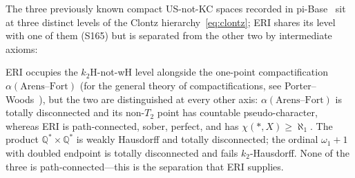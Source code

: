 \documentclass[11pt]{article}
\theoremstyle{definition}
\theoremstyle{remark}
\begin{document}
The three previously known compact US-not-KC spaces recorded in
pi-Base~\cite{bib:pibase} sit at three distinct levels of the Clontz
hierarchy~\eqref{eq:clontz}; ERI shares its level with one of them
(S165) but is separated from the other two by intermediate axioms:

\begin{center}
\end{center}

ERI occupies the $k_2$H-not-wH level alongside the one-point
compactification $\alpha(\text{Arens--Fort})$ (for the general theory
of compactifications, see Porter--Woods~\cite{bib:porterwoods}), but
the two are distinguished at every other axis:
$\alpha(\text{Arens--Fort})$ is totally disconnected and its non-$T_2$
point has countable pseudo-character, whereas ERI is
path-connected, sober, perfect, and has $\chi(\ast, X) \geq \aleph_1$.
The product $\mathbb{Q}^{\ast} \times \mathbb{Q}^{\ast}$ is weakly
Hausdorff and totally disconnected; the ordinal $\omega_1 + 1$ with
doubled endpoint is totally disconnected and fails $k_2$-Hausdorff.
None of the three is path-connected---this is the separation that
ERI supplies.
\end{document}
